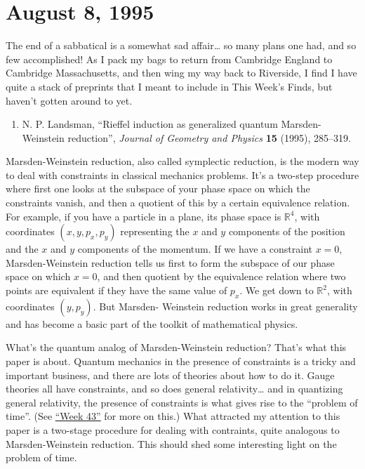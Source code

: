 \documentclass{article}
\def\tightlist{}
\begin{document}
\hypertarget{week60}{%
\section{August 8, 1995}\label{week60}}

The end of a sabbatical is a somewhat sad affair\ldots{} so many plans
one had, and so few accomplished! As I pack my bags to return from
Cambridge England to Cambridge Massachusetts, and then wing my way back
to Riverside, I find I have quite a stack of preprints that I meant to
include in This Week's Finds, but haven't gotten around to yet.

\begin{enumerate}
\def\labelenumi{\arabic{enumi})}
\tightlist
\item
  N. P. Landsman, ``Rieffel induction as generalized quantum
  Marsden-Weinstein reduction'', \emph{Journal of Geometry and Physics}
  \textbf{15} (1995), 285--319.
\end{enumerate}

Marsden-Weinstein reduction, also called symplectic reduction, is the
modern way to deal with constraints in classical mechanics problems.
It's a two-step procedure where first one looks at the subspace of your
phase space on which the constraints vanish, and then a quotient of this
by a certain equivalence relation. For example, if you have a particle
in a plane, its phase space is \(\mathbb{R}^4\), with coordinates
\((x,y,p_x,p_y)\) representing the \(x\) and \(y\) components of the
position and the \(x\) and \(y\) components of the momentum. If we have
a constraint \(x = 0\), Marsden-Weinstein reduction tells us first to
form the subspace of our phase space on which \(x = 0\), and then
quotient by the equivalence relation where two points are equivalent if
they have the same value of \(p_x\). We get down to \(\mathbb{R}^2\),
with coordinates \((y,p_y)\). But Marsden- Weinstein reduction works in
great generality and has become a basic part of the toolkit of
mathematical physics.

What's the quantum analog of Marsden-Weinstein reduction? That's what
this paper is about. Quantum mechanics in the presence of constraints is
a tricky and important business, and there are lots of theories about
how to do it. Gauge theories all have constraints, and so does general
relativity\ldots{} and in quantizing general relativity, the presence of
constraints is what gives rise to the ``problem of time''. (See
\protect\hyperlink{week43}{``Week 43''} for more on this.) What
attracted my attention to this paper is a two-stage procedure for
dealing with contraints, quite analogous to Marsden-Weinstein reduction.
This should shed some interesting light on the problem of time.
\end{document}
